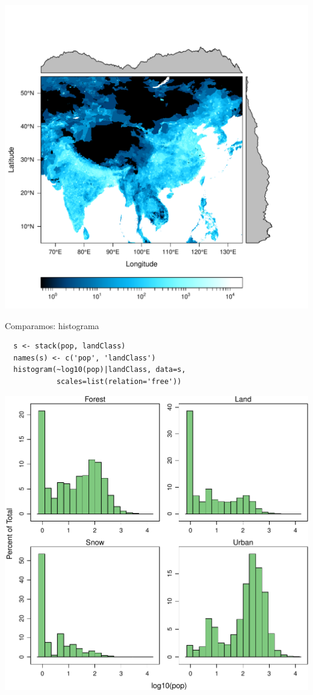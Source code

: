 \documentclass[xcolor={usenames,svgnames,dvipsnames}]{beamer}
\begin{document}
\begin{frame}[label=sec-3-3-2]{}
\includegraphics[width=.9\linewidth]{figs/populationNASA.pdf}
\end{frame}

\begin{frame}[fragile,label=sec-3-3-3]{Comparamos: histograma}
 \lstset{language=R,label= ,caption= ,numbers=none}
\begin{lstlisting}
  s <- stack(pop, landClass)
  names(s) <- c('pop', 'landClass')
  histogram(~log10(pop)|landClass, data=s,
            scales=list(relation='free'))
\end{lstlisting}
\end{frame}
\begin{frame}[label=sec-3-3-4]{}
\includegraphics[width=.9\linewidth]{figs/histogramLandClass.pdf}
\end{frame}
\end{document}
